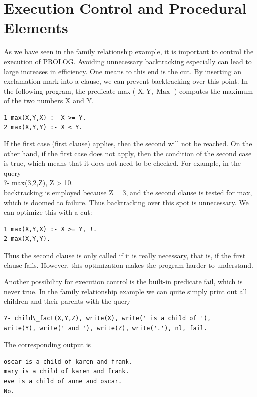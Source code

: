 \documentclass[10pt]{book}
\begin{document}
\section{Execution Control and Procedural Elements}
As we have seen in the family relationship example, it is important to control the execution of PROLOG. Avoiding unnecessary backtracking especially can lead to large increases in efficiency. One means to this end is the cut. By inserting an exclamation mark into a clause, we can prevent backtracking over this point. In the following program, the predicate max ( $\mathrm{X}, \mathrm{Y}, \operatorname{Max}$ ) computes the maximum of the two numbers X and Y.

\begin{verbatim}
1 max(X,Y,X) :- X >= Y.
2 max(X,Y,Y) :- X < Y.
\end{verbatim}

If the first case (first clause) applies, then the second will not be reached. On the other hand, if the first case does not apply, then the condition of the second case is true, which means that it does not need to be checked. For example, in the query\\
?- max(3,2,Z), Z > 10.\\
backtracking is employed because $\mathrm{Z}=3$, and the second clause is tested for max, which is doomed to failure. Thus backtracking over this spot is unnecessary. We can optimize this with a cut:
\begin{verbatim}
1 max(X,Y,X) :- X >= Y, !.
2 max(X,Y,Y).
\end{verbatim}

Thus the second clause is only called if it is really necessary, that is, if the first clause fails. However, this optimization makes the program harder to understand.

Another possibility for execution control is the built-in predicate fail, which is never true. In the family relationship example we can quite simply print out all children and their parents with the query

\begin{verbatim}
?- child\_fact(X,Y,Z), write(X), write(' is a child of '),
write(Y), write(' and '), write(Z), write('.'), nl, fail.
\end{verbatim}

The corresponding output is

\begin{verbatim}
oscar is a child of karen and frank.
mary is a child of karen and frank.
eve is a child of anne and oscar.
No.
\end{verbatim}
\end{document}
